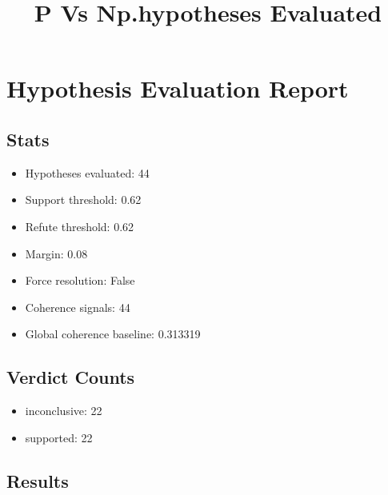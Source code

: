 \documentclass[
]{article}
\title{P Vs Np.hypotheses Evaluated}
\author{}
\date{}
\providecommand{\tightlist}{%
  \setlength{\itemsep}{0pt}\setlength{\parskip}{0pt}}
\begin{document}
\maketitle

\section{Hypothesis Evaluation
Report}\label{hypothesis-evaluation-report}

\subsection{Stats}\label{stats}

\begin{itemize}
\tightlist
\item
  Hypotheses evaluated: 44
\item
  Support threshold: 0.62
\item
  Refute threshold: 0.62
\item
  Margin: 0.08
\item
  Force resolution: False
\item
  Coherence signals: 44
\item
  Global coherence baseline: 0.313319
\end{itemize}

\subsection{Verdict Counts}\label{verdict-counts}

\begin{itemize}
\tightlist
\item
  inconclusive: 22
\item
  supported: 22
\end{itemize}

\subsection{Results}\label{results}
\end{document}
